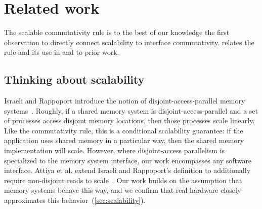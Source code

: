 \section{Related work}
\label{sec:related}


The scalable commutativity rule is to the best of our knowledge the
first observation to directly connect scalability to interface
commutativity.
 relates the rule and its use
in \sys and \tool to prior work.

\subsection{Thinking about scalability}

Israeli and Rappoport introduce the notion of disjoint-access-parallel
memory systems~\cite{israeli:disjoint-access}.  Roughly, if a shared memory system
is disjoint-access-parallel and a set of processes access disjoint memory
locations, then those processes scale linearly.  Like the commutativity rule,
this is a conditional scalability guarantee: if the application uses shared
memory in a particular way, then the shared memory implementation will scale.
However, where disjoint-access parallelism is specialized to the memory system
interface, our work encompasses any software interface.
%
Attiya et al. extend Israeli and Rappoport's definition to additionally require
non-disjoint reads to scale~\cite{attiya:disjoint}.
%
Our work builds on the assumption that
memory systems behave this way, and we confirm that real hardware
closely approximates this behavior~(\cref{sec:scalability}).




